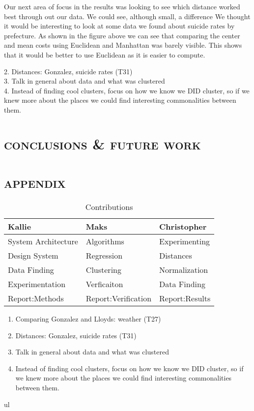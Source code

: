 \documentclass[a4paper, 11pt]{article} %
\begin{document}
Our next area of focus in the results was looking to see which distance worked best through out our data. We could see, although small, a difference  We thought it would be interesting to look at some data we found about suicide rates by prefecture. As shown in the figure above we can see that comparing the center and mean costs using Euclidean and Manhattan was barely visible. This shows that it would be better to use Euclidean as it is easier to compute. 

2. Distances: Gonzalez, suicide rates (T31)\\


3. Talk in general about data and what was clustered\\


4. Instead of finding cool clusters, focus on how we know we DID cluster, so if we knew more about the places we could find interesting commonalities between them.\\

\section{\textsc{conclusions \& future work}}

\section{\textsc{appendix}}

\begin{table}[H]
\centering
\caption{Contributions}
\label{contributions}
\begin{tabular}{|l|l|l|}
\hline
\textbf{Kallie}     & \textbf{Maks}       & \textbf{Christopher} \\ \hline
System Architecture & Algorithms          & Experimenting  \\ \hline
Design System       & Regression          & Distances      \\ \hline
Data Finding        & Clustering          & Normalization  \\ \hline
Experimentation     & Verficaiton         & Data Finding   \\ \hline
Report:Methods      & Report:Verification & Report:Results  \\ \hline
\end{tabular}
\end{table}

\begin{enumerate}
\item Comparing Gonzalez and Lloyds: weather (T27)

\item Distances: Gonzalez, suicide rates (T31)

\item Talk in general about data and what was clustered

\item Instead of finding cool clusters, focus on how we know we DID cluster, so if we knew more about the places we could find interesting commonalities between them.
\end{enumerate}
ul
\end{document}
